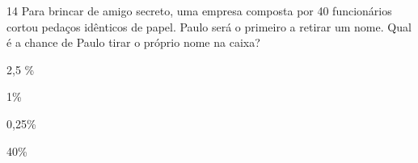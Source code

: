 















\num{14} Para brincar de amigo secreto, uma empresa composta por 40
funcionários cortou pedaços idênticos de papel. Paulo será o primeiro a
retirar um nome. Qual é a chance de Paulo tirar o próprio nome na caixa?
\item 2,5 \%
\item 1\%
\item 0,25\%
\item 40\%



